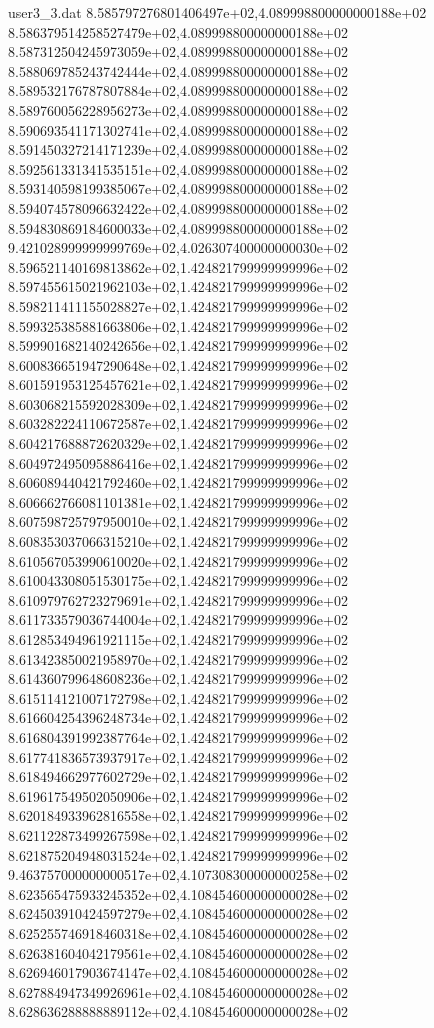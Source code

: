 \begin{filecontents}{user3_3.dat}
8.585797276801406497e+02,4.089998800000000188e+02
8.586379514258527479e+02,4.089998800000000188e+02
8.587312504245973059e+02,4.089998800000000188e+02
8.588069785243742444e+02,4.089998800000000188e+02
8.589532176787807884e+02,4.089998800000000188e+02
8.589760056228956273e+02,4.089998800000000188e+02
8.590693541171302741e+02,4.089998800000000188e+02
8.591450327214171239e+02,4.089998800000000188e+02
8.592561331341535151e+02,4.089998800000000188e+02
8.593140598199385067e+02,4.089998800000000188e+02
8.594074578096632422e+02,4.089998800000000188e+02
8.594830869184600033e+02,4.089998800000000188e+02
9.421028999999999769e+02,4.026307400000000030e+02
8.596521140169813862e+02,1.424821799999999996e+02
8.597455615021962103e+02,1.424821799999999996e+02
8.598211411155028827e+02,1.424821799999999996e+02
8.599325385881663806e+02,1.424821799999999996e+02
8.599901682140242656e+02,1.424821799999999996e+02
8.600836651947290648e+02,1.424821799999999996e+02
8.601591953125457621e+02,1.424821799999999996e+02
8.603068215592028309e+02,1.424821799999999996e+02
8.603282224110672587e+02,1.424821799999999996e+02
8.604217688872620329e+02,1.424821799999999996e+02
8.604972495095886416e+02,1.424821799999999996e+02
8.606089440421792460e+02,1.424821799999999996e+02
8.606662766081101381e+02,1.424821799999999996e+02
8.607598725797950010e+02,1.424821799999999996e+02
8.608353037066315210e+02,1.424821799999999996e+02
8.610567053990610020e+02,1.424821799999999996e+02
8.610043308051530175e+02,1.424821799999999996e+02
8.610979762723279691e+02,1.424821799999999996e+02
8.611733579036744004e+02,1.424821799999999996e+02
8.612853494961921115e+02,1.424821799999999996e+02
8.613423850021958970e+02,1.424821799999999996e+02
8.614360799648608236e+02,1.424821799999999996e+02
8.615114121007172798e+02,1.424821799999999996e+02
8.616604254396248734e+02,1.424821799999999996e+02
8.616804391992387764e+02,1.424821799999999996e+02
8.617741836573937917e+02,1.424821799999999996e+02
8.618494662977602729e+02,1.424821799999999996e+02
8.619617549502050906e+02,1.424821799999999996e+02
8.620184933962816558e+02,1.424821799999999996e+02
8.621122873499267598e+02,1.424821799999999996e+02
8.621875204948031524e+02,1.424821799999999996e+02
9.463757000000000517e+02,4.107308300000000258e+02
8.623565475933245352e+02,4.108454600000000028e+02
8.624503910424597279e+02,4.108454600000000028e+02
8.625255746918460318e+02,4.108454600000000028e+02
8.626381604042179561e+02,4.108454600000000028e+02
8.626946017903674147e+02,4.108454600000000028e+02
8.627884947349926961e+02,4.108454600000000028e+02
8.628636288888889112e+02,4.108454600000000028e+02

\end{filecontents}
